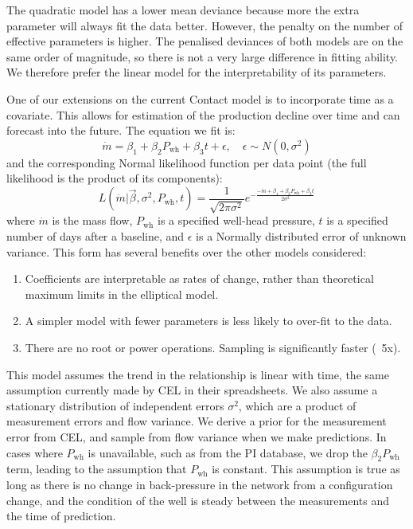 \documentclass[a4paper, 12pt]{article}
\newlength{\drop}
\begin{document}
The quadratic model has a lower mean deviance because more the extra parameter will always fit the data better. However, the penalty on the number of effective parameters is higher. The penalised deviances of both models are on the same order of magnitude, so there is not a very large difference in fitting ability. We therefore prefer the linear model for the interpretability of its parameters.

One of our extensions on the current Contact model is to incorporate time as a covariate. This allows for estimation of the production decline over time and can forecast into the future. The equation we fit is:
\begin{equation} \label{eq:linreg}
\dot{m} = \beta_1 + \beta_2P_\text{wh} + \beta_3t + \epsilon,\quad \epsilon\sim N(0, \sigma^2)
\end{equation}
and the corresponding Normal likelihood function per data point (the full likelihood is the product of its components):
\begin{equation}
L\left( \dot{m} | \vec{\beta},\sigma^2,P_\text{wh},t \right) = \frac{1}{\sqrt{2\pi\sigma^2}} e^{-\frac{-\dot{m} + \beta_1 + \beta_2P_\text{wh} + \beta_3t}{2\sigma^2}}
\end{equation}
where $\dot{m}$ is the mass flow, $P_\text{wh}$ is a specified well-head pressure, $t$ is a specified number of days after a baseline, and $\epsilon$ is a Normally distributed error of unknown variance. This form has several benefits over the other models considered:

\begin{enumerate}
\item Coefficients are interpretable as rates of change, rather than theoretical maximum limits in the elliptical model.
\item A simpler model with fewer parameters is less likely to over-fit to the data.
\item There are no root or power operations. Sampling is significantly faster (~5x).
\end{enumerate}

This model assumes the trend in the relationship is linear with time, the same assumption currently made by CEL in their spreadsheets. We also assume a stationary distribution of independent errors $\sigma^2$, which are a product of measurement errors and flow variance. We derive a prior for the measurement error from CEL, and sample from flow variance when we make predictions. In cases where $P_\text{wh}$ is unavailable, such as from the PI database, we drop the $\beta_2P_\text{wh}$ term, leading to the assumption that $P_\text{wh}$ is constant. This assumption is true as long as there is no change in back-pressure in the network from a configuration change, and the condition of the well is steady between the measurements and the time of prediction.
\end{document}
